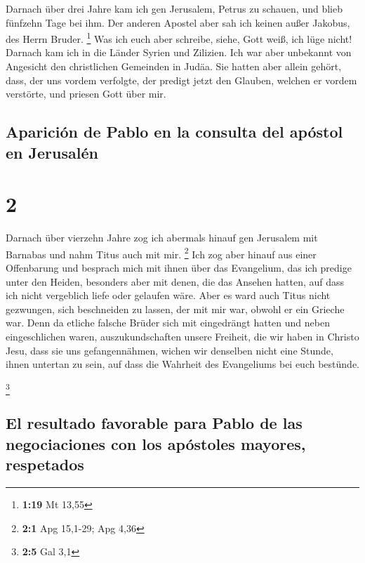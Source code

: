  Darnach über drei Jahre kam ich gen Jerusalem, Petrus zu
schauen, und blieb fünfzehn Tage bei ihm.  Der anderen
Apostel aber sah ich keinen außer Jakobus, des Herrn Bruder. \footnote{\textbf{1:19}
  Mt 13,55}  Was ich euch aber schreibe, siehe, Gott
weiß, ich lüge nicht!  Darnach kam ich in die Länder
Syrien und Zilizien.  Ich war aber unbekannt von
Angesicht den christlichen Gemeinden in Judäa.  Sie
hatten aber allein gehört, dass, der uns vordem verfolgte, der predigt
jetzt den Glauben, welchen er vordem verstörte,  und
priesen Gott über mir.

\hypertarget{apariciuxf3n-de-pablo-en-la-consulta-del-apuxf3stol-en-jerusaluxe9n}{%
\subsection{Aparición de Pablo en la consulta del apóstol en
Jerusalén}\label{apariciuxf3n-de-pablo-en-la-consulta-del-apuxf3stol-en-jerusaluxe9n}}

\hypertarget{section-1}{%
\section{2}\label{section-1}}

 Darnach über vierzehn Jahre zog ich abermals hinauf gen
Jerusalem mit Barnabas und nahm Titus auch mit mir. \footnote{\textbf{2:1}
  Apg 15,1-29; Apg 4,36}  Ich zog aber hinauf aus einer
Offenbarung und besprach mich mit ihnen über das Evangelium, das ich
predige unter den Heiden, besonders aber mit denen, die das Ansehen
hatten, auf dass ich nicht vergeblich liefe oder gelaufen wäre.
 Aber es ward auch Titus nicht gezwungen, sich beschneiden
zu lassen, der mit mir war, obwohl er ein Grieche war. 
Denn da etliche falsche Brüder sich mit eingedrängt hatten und neben
eingeschlichen waren, auszukundschaften unsere Freiheit, die wir haben
in Christo Jesu, dass sie uns gefangennähmen,  wichen wir
denselben nicht eine Stunde, ihnen untertan zu sein, auf dass die
Wahrheit des Evangeliums bei euch bestünde.

\footnote{\textbf{2:5} Gal 3,1}

\hypertarget{el-resultado-favorable-para-pablo-de-las-negociaciones-con-los-apuxf3stoles-mayores-respetados}{%
\subsection{El resultado favorable para Pablo de las negociaciones con
los apóstoles mayores,
respetados}\label{el-resultado-favorable-para-pablo-de-las-negociaciones-con-los-apuxf3stoles-mayores-respetados}}

